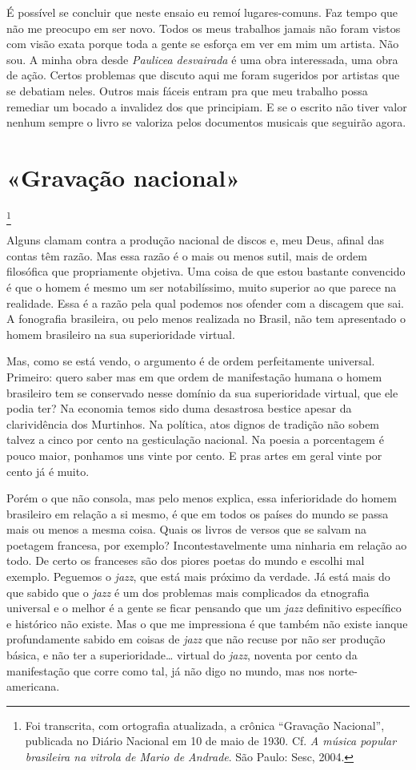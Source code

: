 É possível se concluir que neste ensaio eu remoí lugares-comuns. Faz
tempo que não me preocupo em ser novo. Todos os meus trabalhos jamais
não foram vistos com visão exata porque toda a gente se esforça em ver
em mim um artista. Não sou. A minha obra desde \textit{Paulicea desvairada} é
uma obra interessada, uma obra de ação. Certos problemas que discuto
aqui me foram sugeridos por artistas que se debatiam neles. Outros mais
fáceis entram pra que meu trabalho possa remediar um bocado a invalidez
dos que principiam. E se o escrito não tiver valor nenhum sempre o livro
se valoriza pelos documentos musicais que seguirão agora.


\chapter{«Gravação nacional»}\footnote{Foi transcrita, com ortografia atualizada, a crônica
``Gravação Nacional'', publicada no Diário Nacional em 10 de maio de 1930. Cf. \textit{A música popular brasileira na vitrola de Mario de Andrade}. São Paulo: Sesc, 2004.}


Alguns clamam contra a produção nacional de discos e, meu Deus, afinal
das contas têm razão. Mas essa razão é o mais ou menos sutil, mais de
ordem filosófica que propriamente objetiva. Uma coisa de que estou
bastante convencido é que o homem é mesmo um ser notabilíssimo, muito
superior ao que parece na realidade. Essa é a razão pela qual podemos
nos ofender com a discagem que sai. A fonografia brasileira, ou pelo
menos realizada no Brasil, não tem apresentado o homem brasileiro na sua
superioridade virtual.

Mas, como se está vendo, o argumento é de ordem perfeitamente universal.
Primeiro: quero saber mas em que ordem de manifestação humana o homem
brasileiro tem se conservado nesse domínio da sua superioridade virtual,
que ele podia ter? Na economia temos sido duma desastrosa bestice apesar
da clarividência dos Murtinhos. Na política, atos dignos de tradição não
sobem talvez a cinco por cento na gesticulação nacional. Na poesia a
porcentagem é pouco maior, ponhamos uns vinte por cento. E pras artes em
geral vinte por cento já é muito.

Porém o que não consola, mas pelo menos explica, essa inferioridade do
homem brasileiro em relação a si mesmo, é que em todos os países do
mundo se passa mais ou menos a mesma coisa. Quais os livros de versos
que se salvam na poetagem francesa, por exemplo? Incontestavelmente uma
ninharia em relação ao todo. De certo os franceses são dos piores poetas
do mundo e escolhi mal exemplo. Peguemos o \textit{jazz}, que está mais
próximo da verdade. Já está mais do que sabido que o \textit{jazz} é um
dos problemas mais complicados da etnografia universal e o melhor é a
gente se ficar pensando que um \textit{jazz} definitivo específico e
histórico não existe. Mas o que me impressiona é que também não existe
ianque profundamente sabido em coisas de \textit{jazz} que não recuse por
não ser produção básica, e não ter a superioridade\ldots{} virtual do
\textit{jazz}, noventa por cento da manifestação que corre como tal, já
não digo no mundo, mas nos norte-americana.


